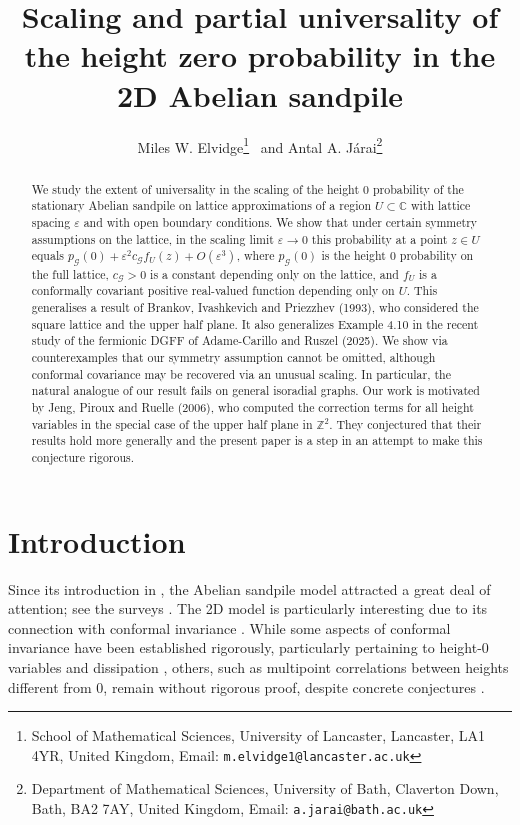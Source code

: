 \documentclass[11pt]{article}
\title{Scaling and partial universality of the height zero probability in the 2D Abelian sandpile}
\author{Miles W. Elvidge\thanks{School of Mathematical Sciences, 
University of Lancaster, Lancaster, LA1 4YR, United Kingdom,
Email: \texttt{m.elvidge1@lancaster.ac.uk}} \ 
and Antal A. J\'arai\thanks{Department of Mathematical Sciences,
University of Bath, Claverton Down, Bath, BA2 7AY, United Kingdom,
Email: \texttt{a.jarai@bath.ac.uk}}}
\theoremstyle{remark}
\def\eps{\varepsilon}
\def\C{\mathbb{C}}
\def\Z{\mathbb{Z}}
\def\cG{\mathcal{G}}
\begin{document}
\maketitle

\begin{abstract}
We study the extent of universality in the scaling of the height $0$ probability of
the stationary Abelian sandpile on lattice approximations of a region 
$U \subset \C$ with lattice spacing $\eps$ and with open boundary conditions. 
We show that under certain symmetry assumptions on the lattice, in the scaling 
limit $\eps \to 0$ this probability at a point $z \in U$ equals 
$p_\cG(0) + \eps^2 c_\cG f_U(z) + O(\eps^3)$, where $p_\cG(0)$ 
is the height $0$ probability on the full lattice, $c_\cG > 0$ is a constant 
depending only on the lattice, and $f_U$ is a conformally covariant positive 
real-valued function depending only on $U$. This generalises a result of 
Brankov, Ivashkevich and Priezzhev (1993), who considered the square 
lattice and the upper half plane. It also generalizes Example 4.10 in the recent 
study of the fermionic DGFF of Adame-Carillo and Ruszel (2025).
We show via counterexamples that our symmetry assumption cannot be omitted,
although conformal covariance may be recovered via an unusual scaling. 
In particular, the natural analogue of our result fails on general isoradial graphs. 
Our work is motivated by Jeng, Piroux and Ruelle (2006), who computed the 
correction terms for all height variables in the special case of the upper 
half plane in $\Z^2$. They conjectured that their results hold more generally 
and the present paper is a step in an attempt to make this conjecture rigorous.
\end{abstract}

\tableofcontents

\section{Introduction}

Since its introduction in \cite{BTW87,Dhar1990}, the Abelian sandpile model attracted 
a great deal of attention; see the surveys 
\cite{Dhar-survey,Redig06,Holroyd08,sandpilemodels,Ruelle21}. 
The 2D model is particularly interesting due to its connection with conformal invariance 
\cite{PirouxRuelle04a,PirouxRuelle04b,JPR06,Ruelle21}. While some aspects of conformal 
invariance have been established rigorously, particularly pertaining to height-$0$ 
variables and dissipation 
\cite{Durre2009,KasselWu15,PonceletRuelle17,PonceletRuelle18,A-CR25},
others, such as multipoint correlations between heights different from $0$, remain without
rigorous proof, despite concrete conjectures \cite{Ruelle21}.
\end{document}
